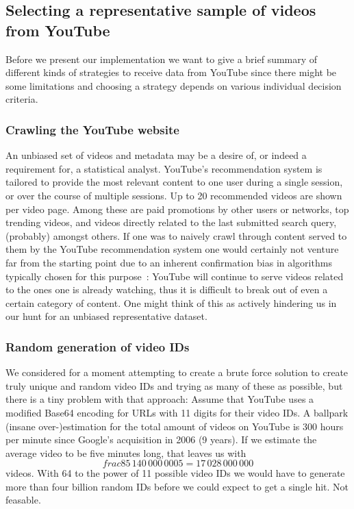 \subsection{Selecting a representative sample of videos from YouTube}


Before we present our implementation we want to give a brief summary of
different kinds of strategies to receive data from YouTube since there might be
some limitations and choosing a strategy depends on various individual decision
criteria.

\subsubsection{Crawling the YouTube website}
An unbiased set of videos and metadata may be a desire of, or indeed a
requirement for, a statistical analyst. YouTube's recommendation system is
tailored to provide the most relevant content to one user during a single
session, or over the course of multiple sessions. Up to 20 recommended videos are shown per video page. Among these are paid
promotions by other users or networks, top trending videos, and videos directly related to the last
submitted search query, (probably) amongst others. If one was to naively crawl
through content served to them by the YouTube recommendation system one would
certainly not venture far from the starting point due to an inherent
confirmation bias in algorithms typically chosen for this
purpose~\cite{youtube-recommendation-system}: YouTube will
continue to serve videos related to the ones one is already watching, thus it is
difficult to break out of even a certain category of content. One might think of
this as actively hindering us in our hunt for an unbiased representative dataset.

\subsubsection{Random generation of video IDs}
We considered for a moment attempting to create a brute force solution to
create truly unique and random video IDs and trying as many of these as
possible, but there is a tiny problem with that approach:
Assume that YouTube uses a modified Base64 encoding for URLs with 11 digits
for their video IDs. A ballpark (insane over-)estimation for the total amount of videos on
YouTube is 300 hours per minute since Google's acquisition in 2006 (9 years).
If we estimate the average video to be five minutes long, that leaves us with
\[frac{85\,140\,000\,000}{5} = 17\,028\,000\,000\] videos. With 64 to the power
of 11 possible video IDs we would have to generate more than four billion random
IDs before we could expect to get a single hit. Not feasable.

